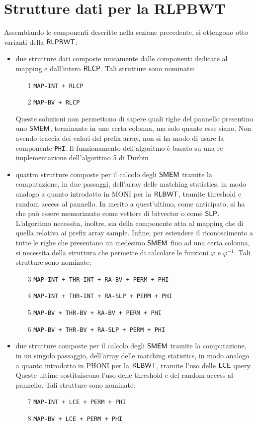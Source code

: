 \section{Strutture dati per la RLPBWT}
Assemblando le componenti descritte nella sezione precedente, si ottengono otto
varianti della $\mbox{\rm {\sf RLPBWT}}$:
\begin{itemize}
  \item due strutture dati composte unicamente dalle componenti dedicate al
  mapping e dall'intero $\mbox{\rm {\sf RLCP}}$. Tali strutture sono nominate:
  \begin{enumerate}
    \item[1] \texttt{MAP-INT + RLCP}
    \item[2] \texttt{MAP-BV + RLCP}
  \end{enumerate}
  Queste soluzioni non permettono di sapere quali righe del pannello
  presentino uno $\mbox{\rm {\sf SMEM}}$, terminante in una certa colonna, ma solo quante
  esse siano. Non avendo traccia dei valori del prefix array, non si ha modo di
  usare la componente \texttt{PHI}. Il funzionamento dell'algoritmo è basato su
  una re-implementazione 
  dell'algoritmo 5 di Durbin
  \item quattro strutture composte per il calcolo degli $\mbox{\rm {\sf SMEM}}$ tramite la
  computazione, 
  in due passaggi, dell'array delle matching statistics, in modo analogo
  a quanto introdotto in MONI \cite{moni} per la $\mbox{\rm {\sf RLBWT}}$, tramite
  threshold e random access al pannello. In merito a quest'ultimo, come
  anticipato, si ha che può essere memorizzato come vettore di
  bitvector o come 
  $\mbox{\rm {\sf SLP}}$. L'algoritmo  
  necessita, inoltre, sia della componente atta al mapping che di quella
  relativa ai prefix array sample. Infine, per estendere il
  riconoscimento a tutte le righe che presentano un medesimo $\mbox{\rm {\sf SMEM}}$ fino ad una
  certa colonna, si necessita della struttura che permette di calcolare le
  funzioni $\varphi$ e $\varphi^{-1}$. Tali strutture sono nominate:
  \begin{enumerate}
    \item[3] \texttt{MAP-INT + THR-INT + RA-BV + PERM + PHI}
    \item[4] \texttt{MAP-INT + THR-INT + RA-SLP + PERM + PHI}
    \item[5] \texttt{MAP-BV + THR-BV + RA-BV + PERM + PHI}
    \item[6] \texttt{MAP-BV + THR-BV + RA-SLP + PERM + PHI}
  \end{enumerate}
  \item due strutture composte per il calcolo degli $\mbox{\rm {\sf SMEM}}$ tramite la
  computazione, 
  in un singolo passaggio, dell'array delle matching statistics, in modo
  analogo a quanto introdotto in PHONI \cite{phoni} per la $\mbox{\rm {\sf RLBWT}}$, tramite
  l'uso delle $\mbox{\rm {\sf LCE}}$ query. Queste ultime sostituiscono l'uso delle
  threshold e del random access al pannello. Tali strutture
  sono nominate: 
  \begin{enumerate}
    \item[7] \texttt{MAP-INT + LCE + PERM + PHI}
    \item[8] \texttt{MAP-BV + LCE + PERM + PHI}
  \end{enumerate}
\end{itemize}
